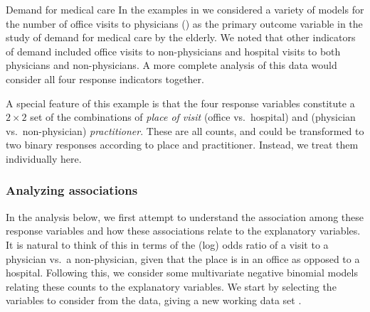 \documentclass[11pt]{book}\usepackage[]{graphicx}\usepackage[]{color}
\begin{document}
\begin{Example}[nmes4]{Demand for medical care}
In the examples in  we considered a variety of models
for the number of office visits to physicians ()
as the primary outcome variable in the study of demand for medical care by the
elderly. We noted that other indicators of demand included office visits to
non-physicians and hospital visits to both physicians and non-physicians.
A more complete analysis of this data would consider all four response
indicators together.

A special feature of this example is that the four response variables constitute
a $2 \times 2$ set of the combinations
of \emph{place of visit} (office vs.\ hospital) and (physician vs.\ non-physician) \emph{practitioner}.
These are all counts, and could be transformed to two binary responses according to
place and practitioner.  Instead, we treat them individually here.

\subsubsection{Analyzing associations}
In the analysis below, we first attempt to understand the association among these response variables
and how these associations relate to the explanatory variables.  It is natural to think of this in terms
of the (log) odds ratio of a visit to a physician vs.\ a non-physician, given that the place
is in an office as opposed to a hospital.
Following this, we consider some multivariate negative binomial models relating these counts to the
explanatory variables.  We start by selecting the variables to consider from the  data,
giving a new working data set .


\end{Example}
\end{document}
